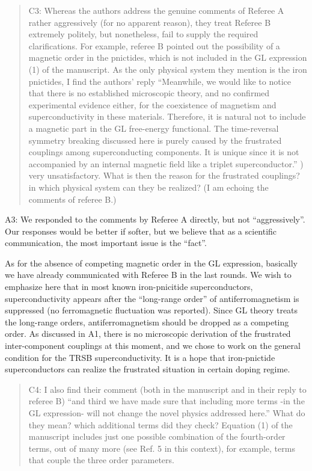 \documentclass[11pt]{article}
\begin{document}
\begin{quote}
C3: Whereas the authors address the genuine comments of Referee A rather
aggressively (for no apparent reason), they treat Referee B extremely
politely, but nonetheless, fail to supply the required clarifications.
For example, referee B pointed out the possibility of a magnetic order
in the pnictides, which is not included in the GL expression (1) of the
manuscript. As the only physical system they mention is the iron
pnictides, I find the authors' reply ``Meanwhile, we would like to
notice that there is no established microscopic theory, and no confirmed
experimental evidence either, for the coexistence of magnetism and
superconductivity in these materials. Therefore, it is natural not to
include a magnetic part in the GL free-energy functional. The
time-reversal symmetry breaking discussed here is purely caused by the
frustrated couplings among superconducting components. It is unique
since it is not accompanied by an internal magnetic field like a triplet
superconductor.'' ) very unsatisfactory. What is then the reason for the
frustrated couplings? in which physical system can they be realized? (I
am echoing the comments of referee B.)
\end{quote}

A3: We responded to the comments by Referee A directly, but not
``aggressively''. Our responses would be better if softer, but we
believe that as a scientific communication, the most important issue is
the ``fact''.

As for the absence of competing magnetic order in the GL expression,
basically we have already communicated with Referee B in the last
rounds. We wish to emphasize here that in most known iron-pnicitide
superconductors, superconductivity appears after the ``long-range
order'' of antiferromagnetism is suppressed (no ferromagnetic
fluctuation was reported). Since GL theory treats the long-range orders,
antiferromagnetism should be dropped as a competing order. As discussed
in A1, there is no microscopic derivation of the frustrated
inter-component couplings at this moment, and we chose to work on the
general condition for the TRSB superconductivity. It is a hope that
iron-pnictide superconductors can realize the frustrated situation in
certain doping regime.

\begin{quote}
C4: I also find their comment (both in the manuscript and in their reply
to referee B) ``and third we have made sure that including more terms
-in the GL expression- will not change the novel physics addressed
here.'' What do they mean? which additional terms did they check?
Equation (1) of the manuscript includes just one possible combination of
the fourth-order terms, out of many more (see Ref. 5 in this context),
for example, terms that couple the three order parameters.
\end{quote}
\end{document}
